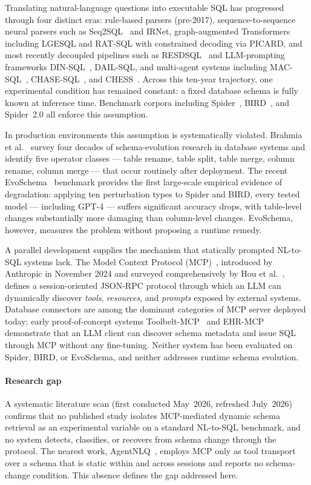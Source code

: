 \documentclass[conference,10pt,a4paper]{IEEEtran}
\begin{document}
Translating natural-language questions into executable SQL has progressed
through four distinct eras: rule-based parsers (pre-2017), sequence-to-sequence
neural parsers such as Seq2SQL~\cite{zhong2017seq2sql} and IRNet, graph-augmented
Transformers including LGESQL and RAT-SQL with constrained decoding via
PICARD, and most recently decoupled pipelines such as
RESDSQL~\cite{li2023resdsql} and LLM-prompting frameworks
DIN-SQL~\cite{pourreza2023dinsql}, DAIL-SQL, and multi-agent systems
including MAC-SQL~\cite{wang2025macsql}, CHASE-SQL~\cite{pourreza2025chasesql}, and CHESS~\cite{talaei2024chess}. Across this
ten-year trajectory, one experimental condition has remained constant: a
fixed database schema is fully known at inference time. Benchmark corpora
including Spider~\cite{yu2018spider}, BIRD~\cite{li2023bird}, and Spider~2.0
all enforce this assumption.

In production environments this assumption is systematically violated.
Brahmia et al.~\cite{brahmia2024schemaevol} survey four decades of
schema-evolution research in database systems and identify five operator
classes --- table rename, table split, table merge, column rename, column
merge --- that occur routinely after deployment. The recent
EvoSchema~\cite{zhang2025evoschema} benchmark provides the first large-scale
empirical evidence of degradation: applying ten perturbation types to Spider
and BIRD, every tested model — including GPT-4 — suffers significant
accuracy drops, with table-level changes substantially more damaging than
column-level changes. EvoSchema, however, measures the problem without
proposing a runtime remedy.

A parallel development supplies the mechanism that statically prompted
NL-to-SQL systems lack. The Model Context Protocol
(MCP)~\cite{anthropic2024mcp}, introduced by Anthropic in November 2024 and
surveyed comprehensively by Hou et al.~\cite{hou2025mcp}, defines a
session-oriented JSON-RPC protocol through which an LLM can dynamically
discover \emph{tools}, \emph{resources}, and \emph{prompts} exposed by
external systems. Database connectors are among the dominant categories of
MCP server deployed today; early proof-of-concept systems
Toolbelt-MCP~\cite{agater2026toolbelt} and EHR-MCP~\cite{masayoshi2025ehrmcp}
demonstrate that an LLM client can discover schema metadata and issue SQL
through MCP without any fine-tuning. Neither system has been evaluated on
Spider, BIRD, or EvoSchema, and neither addresses runtime schema evolution.

\paragraph*{Research gap}
A systematic literature scan (first conducted May~2026, refreshed
July~2026) confirms that no published study isolates MCP-mediated
dynamic schema retrieval as an experimental variable on a standard
NL-to-SQL benchmark, and no system detects, classifies, or recovers
from schema change through the protocol. The nearest work,
AgentNLQ~\cite{bogdanov2026agentnlq}, employs MCP only as tool
transport over a schema that is static within and across sessions and
reports no schema-change condition. This absence defines the gap
addressed here.
\end{document}
